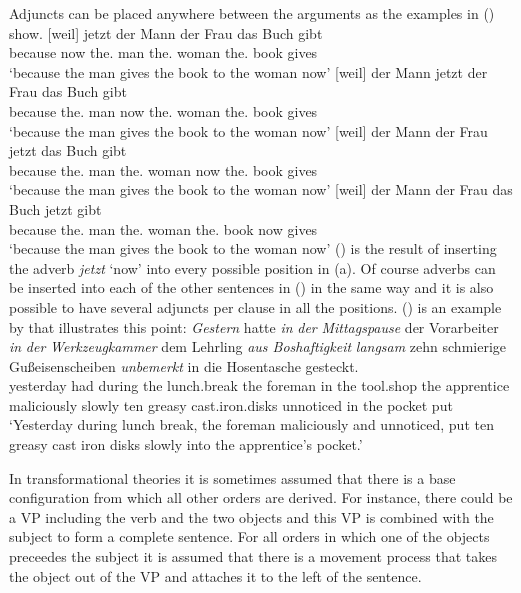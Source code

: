 Adjuncts can be placed anywhere between the arguments as the examples in () show.
\eal
\ex
\gll {}[weil] jetzt der Mann der Frau das Buch gibt\\
     {}\spacebr{}because now the.\nom{} man the.\dat{} woman the.\acc{} book gives\\
\glt `because the man gives the book to the woman now'
\ex
\gll {}[weil] der Mann jetzt der Frau das Buch gibt\\
     {}\spacebr{}because the.\nom{} man now the.\dat{} woman the.\acc{} book gives\\
\glt `because the man gives the book to the woman now'
\ex
\gll {}[weil] der Mann der Frau jetzt das Buch gibt\\
     {}\spacebr{}because the.\nom{} man the.\dat{} woman now the.\acc{} book gives\\
\glt `because the man gives the book to the woman now'
\ex
\gll {}[weil] der Mann der Frau das Buch jetzt gibt\\
     {}\spacebr{}because the.\nom{} man the.\dat{} woman the.\acc{} book now gives\\
\glt `because the man gives the book to the woman now'
\zl
() is the result of inserting the adverb \emph{jetzt} `now' into every possible position in
(a). Of course adverbs can be inserted into each of the other sentences in () in the
same way and it is also possible to have several adjuncts per clause in all the positions. ()
is an example by \citet[]{Uszkoreit87a} that illustrates this point:
\ea
\gll \emph{Gestern} hatte \emph{in} \emph{der} \emph{Mittagspause} der Vorarbeiter \emph{in}
     \emph{der} \emph{Werkzeugkammer} dem Lehrling \emph{aus Boshaftigkeit} \emph{langsam} zehn
     schmierige Gußeisenscheiben \emph{unbemerkt} in die Hosentasche gesteckt. \\ 
     yesterday had during the lunch.break the foreman in the tool.shop the apprentice maliciously slowly ten
     greasy cast.iron.disks unnoticed in the pocket put\\
\glt `Yesterday during lunch break, the foreman maliciously and
unnoticed, put ten greasy cast iron disks slowly into the
apprentice's pocket.'
\z

In transformational theories it is sometimes assumed that there is a base configuration from which
all other orders are derived. For instance, there could be a VP including the verb and the two
objects and this VP is combined with the subject to form a complete sentence. For all orders in
which one of the objects preceedes the subject it is assumed that there is a movement process that
takes the object out of the VP and attaches it to the left of the sentence.

